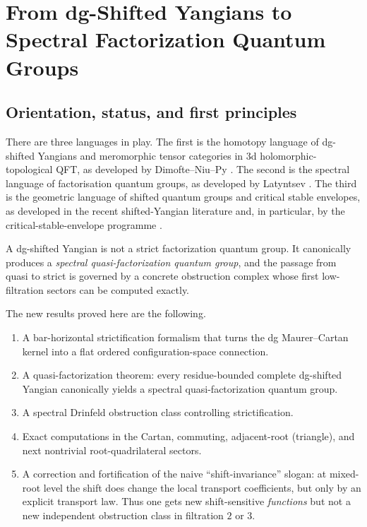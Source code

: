 \chapter{From dg-Shifted Yangians to Spectral Factorization Quantum Groups}
\label{chap:dg-shifted-factorization}

\section{Orientation, status, and first principles}

There are three languages in play.
The first is the homotopy language of dg-shifted Yangians and
meromorphic tensor categories in 3d holomorphic-topological QFT,
as developed by Dimofte--Niu--Py \cite{DNP25}.
The second is the spectral language of factorisation quantum groups,
as developed by Latyntsev \cite{Latyntsev23}.
The third is the geometric language of shifted quantum groups and
critical stable envelopes, as developed in the recent shifted-Yangian
literature and, in particular, by the critical-stable-envelope
programme \cite{COZZ26}.

A dg-shifted Yangian is not a strict factorization quantum group.
It canonically produces a \emph{spectral quasi-factorization quantum
group}, and the passage from quasi to strict is governed by a concrete
obstruction complex whose first low-filtration sectors can be computed
exactly.

The new results proved here are the following.
\begin{enumerate}
\item A bar-horizontal strictification formalism that turns the dg
  Maurer--Cartan kernel into a flat ordered configuration-space
  connection.
\item A quasi-factorization theorem: every residue-bounded complete
  dg-shifted Yangian canonically yields a spectral
  quasi-factorization quantum group.
\item A spectral Drinfeld obstruction class controlling strictification.
\item Exact computations in the Cartan, commuting, adjacent-root
  (triangle), and next nontrivial root-quadrilateral sectors.
\item A correction and fortification of the naive ``shift-invariance''
  slogan: at mixed-root level the shift does change the local transport
  coefficients, but only by an explicit transport law.  Thus one gets
  new shift-sensitive \emph{functions} but not a new independent
  obstruction class in filtration $2$ or $3$.
\end{enumerate}

